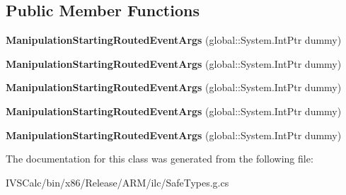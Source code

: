 \subsection*{Public Member Functions}
\begin{DoxyCompactItemize}
\item 
\mbox{\label{class_windows_1_1_u_i_1_1_xaml_1_1_input_1_1_manipulation_starting_routed_event_args_ae240af6e13005283ca5c088790c26699}} 
{\bfseries Manipulation\+Starting\+Routed\+Event\+Args} (global\+::\+System.\+Int\+Ptr dummy)
\item 
\mbox{\label{class_windows_1_1_u_i_1_1_xaml_1_1_input_1_1_manipulation_starting_routed_event_args_ae240af6e13005283ca5c088790c26699}} 
{\bfseries Manipulation\+Starting\+Routed\+Event\+Args} (global\+::\+System.\+Int\+Ptr dummy)
\item 
\mbox{\label{class_windows_1_1_u_i_1_1_xaml_1_1_input_1_1_manipulation_starting_routed_event_args_ae240af6e13005283ca5c088790c26699}} 
{\bfseries Manipulation\+Starting\+Routed\+Event\+Args} (global\+::\+System.\+Int\+Ptr dummy)
\item 
\mbox{\label{class_windows_1_1_u_i_1_1_xaml_1_1_input_1_1_manipulation_starting_routed_event_args_ae240af6e13005283ca5c088790c26699}} 
{\bfseries Manipulation\+Starting\+Routed\+Event\+Args} (global\+::\+System.\+Int\+Ptr dummy)
\item 
\mbox{\label{class_windows_1_1_u_i_1_1_xaml_1_1_input_1_1_manipulation_starting_routed_event_args_ae240af6e13005283ca5c088790c26699}} 
{\bfseries Manipulation\+Starting\+Routed\+Event\+Args} (global\+::\+System.\+Int\+Ptr dummy)
\end{DoxyCompactItemize}


The documentation for this class was generated from the following file\+:\begin{DoxyCompactItemize}
\item 
I\+V\+S\+Calc/bin/x86/\+Release/\+A\+R\+M/ilc/Safe\+Types.\+g.\+cs\end{DoxyCompactItemize}
